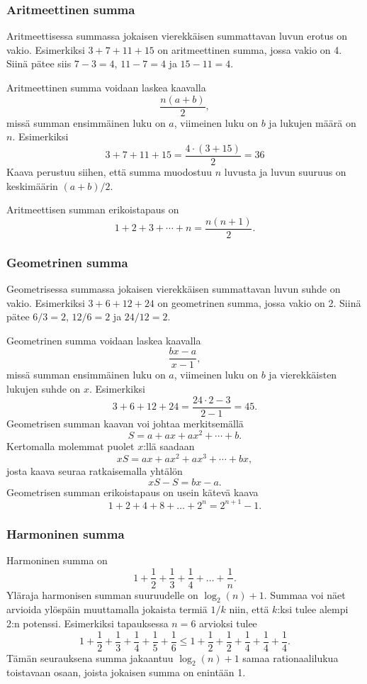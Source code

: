 \subsubsection{Aritmeettinen summa}

Aritmeettisessa summassa jokaisen vierekkäisen
summattavan luvun erotus on vakio.
Esimerkiksi $3+7+11+15$ on aritmeettinen summa,
jossa vakio on 4.
Siinä pätee siis $7-3=4$, $11-7=4$ ja $15-11=4$.

Aritmeettinen summa voidaan laskea kaavalla
\[\frac{n(a+b)}{2},\]
missä summan ensimmäinen luku on $a$,
viimeinen luku on $b$ ja lukujen määrä on $n$.
Esimerkiksi
\[3+7+11+15=\frac{4 \cdot (3+15)}{2} = 36\]
Kaava perustuu siihen, että summa muodostuu $n$ luvusta
ja luvun suuruus on keskimäärin $(a+b)/2$.

Aritmeettisen summan erikoistapaus on
\[1+2+3+\cdots+n = \frac{n(n+1)}{2}.\]

\subsubsection{Geometrinen summa}

Geometrisessa summassa jokaisen vierekkäisen
summattavan luvun suhde on vakio.
Esimerkiksi $3+6+12+24$ on geometrinen summa,
jossa vakio on 2.
Siinä pätee $6/3=2$, $12/6=2$ ja $24/12=2$.

Geometrinen summa voidaan laskea kaavalla
\[\frac{bx-a}{x-1},\]
missä summan ensimmäinen luku on $a$,
viimeinen luku on $b$ ja vierekkäisten lukujen suhde on $x$.
Esimerkiksi
\[3+6+12+24=\frac{24 \cdot 2 - 3}{2-1} = 45.\]
Geometrisen summan kaavan voi johtaa merkitsemällä
\[ S = a + ax + ax^2 + \cdots + b .\] 
Kertomalla molemmat puolet $x$:llä saadaan
\[ xS = ax + ax^2 + ax^3 + \cdots + bx,\]
josta kaava seuraa ratkaisemalla yhtälön
\[ xS-S = bx-a.\]
Geometrisen summan erikoistapaus on usein kätevä kaava
\[1+2+4+8+\ldots+2^n=2^{n+1}-1.\]

\subsubsection{Harmoninen summa}

Harmoninen summa on
\[ 1+\frac{1}{2}+\frac{1}{3}+\frac{1}{4}+\ldots+\frac{1}{n}.\]
Yläraja harmonisen summan suuruudelle on $\log_2(n)+1$.
Summaa voi näet arvioida ylöspäin
muuttamalla jokaista termiä $1/k$ niin,
että $k$:ksi tulee alempi 2:n potenssi.
Esimerkiksi tapauksessa $n=6$ arvioksi tulee
\[ 1+\frac{1}{2}+\frac{1}{3}+\frac{1}{4}+\frac{1}{5}+\frac{1}{6} \le
1+\frac{1}{2}+\frac{1}{2}+\frac{1}{4}+\frac{1}{4}+\frac{1}{4}.\]
Tämän seurauksena summa jakaantuu $\log_2(n)+1$ samaa
rationaalilukua toistavaan osaan, joista jokaisen summa on enintään 1.


